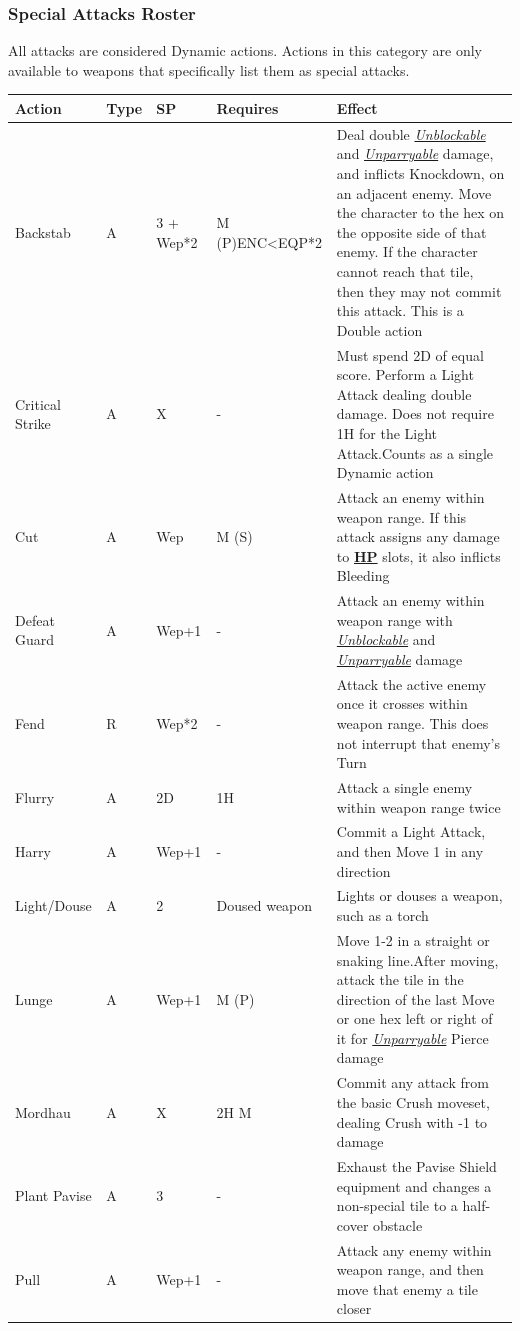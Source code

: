 \documentclass[12pt]{article}
\newcommand{\refto}[1]{\hyperlink{#1}{\textbf{#1}}}
\newcommand{\reftoit}[1]{\hyperlink{#1}{\emph{#1}}}
\begin{document}
\subsubsection{Special Attacks Roster}
All attacks are considered Dynamic actions. Actions in this category are only available to weapons that specifically list them as special attacks.\\
\begin{center}
\begin{tabularx}{\textwidth}{p{}p{}p{}p{}p{}}
\hline
\rowcolor{white} \textbf{Action} & \textbf{Type} & \textbf{SP} & \textbf{Requires} & \textbf{Effect}\setcounter{rownum}{0}\\
\hline
Backstab & A & 3 + Wep*2 & M (P)\newline ENC<EQP*2 & Deal double \reftoit{Unblockable} and \reftoit{Unparryable} damage, and inflicts Knockdown, on an adjacent enemy.\newline
Move the character to the hex on the opposite side of that enemy. If the character cannot reach that tile, then they may not commit this attack.\newline
This is a Double action\\
Critical Strike & A & X & - & Must spend 2D of equal score. Perform a Light Attack dealing double damage.\newline
Does not require 1H for the Light Attack.\newline Counts as a single Dynamic action\\
Cut & A & Wep & M (S) & Attack an enemy within weapon range. If this attack assigns any damage to \refto{HP} slots, it also inflicts Bleeding\\
Defeat Guard & A & Wep+1 & - & Attack an enemy within weapon range with \reftoit{Unblockable} and \reftoit{Unparryable} damage\\
Fend & R & Wep*2 & - & Attack the active enemy once it crosses within weapon range. This does not interrupt that enemy’s Turn \\
Flurry & A & 2D & 1H & Attack a single enemy within weapon range twice\\
Harry & A & Wep+1 & - & Commit a Light Attack, and then Move 1 in any direction \\
Light/Douse & A & 2 & Doused weapon & Lights or douses a weapon, such as a torch\\
Lunge & A & Wep+1 & M (P) & Move 1-2 in a straight or snaking line.\newline After moving, attack the tile in the direction of the last Move or one hex left or right of it for \reftoit{Unparryable} Pierce damage\\
Mordhau & A & X & 2H M & Commit any attack from the basic Crush moveset, dealing Crush with -1 to damage\\
Plant Pavise & A & 3 & - & Exhaust the Pavise Shield equipment and changes a non-special tile to a half-cover obstacle\\
Pull & A & Wep+1 & - & Attack any enemy within weapon range, and then move that enemy a tile closer\\
\hline
\end{tabularx}
\end{center}
\end{document}
